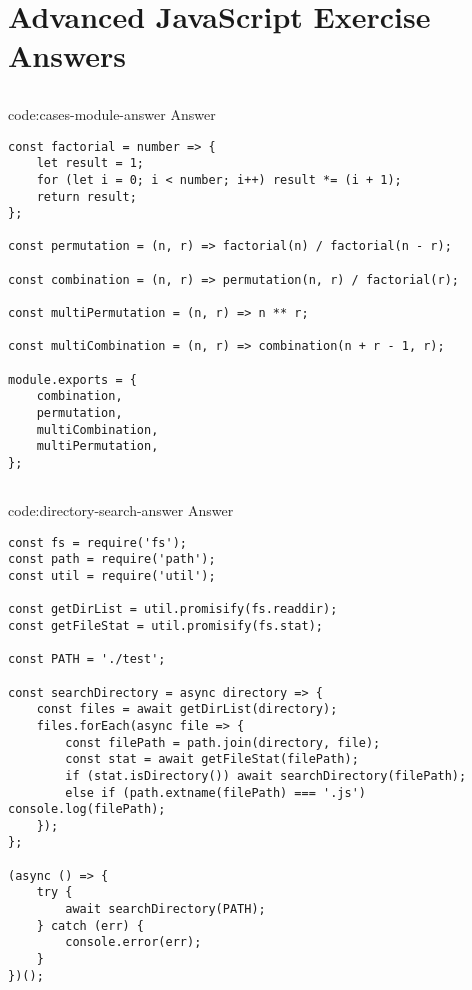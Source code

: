 \section{Advanced JavaScript Exercise Answers}\label{sect:advanced-js-answers}

\subsection*{}

\begin{code}{code:cases-module-answer}{ Answer}
\begin{verbatim}
const factorial = number => {
    let result = 1;
    for (let i = 0; i < number; i++) result *= (i + 1);
    return result;
};

const permutation = (n, r) => factorial(n) / factorial(n - r);

const combination = (n, r) => permutation(n, r) / factorial(r);

const multiPermutation = (n, r) => n ** r;

const multiCombination = (n, r) => combination(n + r - 1, r);

module.exports = {
    combination,
    permutation,
    multiCombination,
    multiPermutation,
};
\end{verbatim}
\end{code}

\subsection*{}

\begin{code}{code:directory-search-answer}{ Answer}
\begin{verbatim}
const fs = require('fs');
const path = require('path');
const util = require('util');

const getDirList = util.promisify(fs.readdir);
const getFileStat = util.promisify(fs.stat);

const PATH = './test';

const searchDirectory = async directory => {
    const files = await getDirList(directory);
    files.forEach(async file => {
        const filePath = path.join(directory, file);
        const stat = await getFileStat(filePath);
        if (stat.isDirectory()) await searchDirectory(filePath);
        else if (path.extname(filePath) === '.js') console.log(filePath);
    });
};

(async () => {
    try {
        await searchDirectory(PATH);
    } catch (err) {
        console.error(err);
    }
})();
\end{verbatim}
\end{code}
